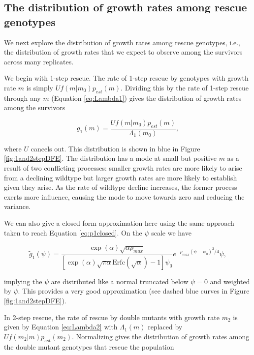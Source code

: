 \documentclass[9pt,twocolumn,twoside,lineno]{gsajnl}
\begin{document}
\subsection{The distribution of growth rates among rescue genotypes}

We next explore the distribution of growth rates among rescue genotypes, i.e., the distribution of growth rates that we expect to observe among the survivors across many replicates.

We begin with 1-step rescue.
The rate of 1-step rescue by genotypes with growth rate $m$ is simply $U f(m|m_0) p_{est}(m)$.
Dividing this by the rate of 1-step rescue through any $m$ (Equation \ref{eq:Lambda1}) gives the distribution of growth rates among the survivors

\begin{equation}\label{eq:g1m}
g_1(m) = \frac{U f(m|m_0) p_{est}(m)}{\Lambda_1(m_0)},
\end{equation}

\noindent where $U$ cancels out.
This distribution is shown in blue in Figure \ref{fig:1and2stepDFE}.
The distribution has a mode at small but positive $m$ as a result of two conflicting processes: smaller growth rates are more likely to arise from a declining wildtype but larger growth rates are more likely to establish given they arise. 
As the rate of wildtype decline increases, the former process exerts more influence, causing the mode to move towards zero and reducing the variance.

We can also give a closed form approximation here using the same approach taken to reach Equation \ref{eq:p1closed}.
On the $\psi$ scale we have

\begin{equation}\label{eq:tildeg1m}
\tilde{g}_1(\psi) = \frac{\exp(\alpha)\sqrt{\alpha \rho_{max}}}{[\exp(\alpha)\sqrt{\pi \alpha} \mathrm{Erfc}(\sqrt{\alpha}) - 1]\psi_0} e^{- \rho_{max} (\psi-\psi_0)^2/4} \psi,
\end{equation}

\noindent implying the $\psi$ are distributed like a normal truncated below $\psi=0$ and weighted by $\psi$.
This provides a very good approximation (see dashed blue curves in Figure \ref{fig:1and2stepDFE}).

In 2-step rescue, the rate of rescue by double mutants with growth rate $m_2$ is given by Equation \ref{eq:Lambda2} with $\Lambda_1(m)$ replaced by $U f(m_2|m) p_{est}(m_2)$.
Normalizing gives the distribution of growth rates among the double mutant genotypes that rescue the population
\end{document}
